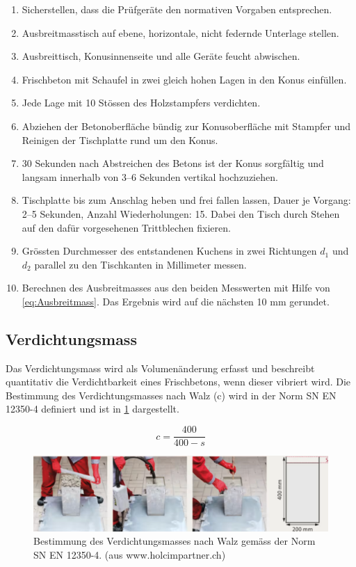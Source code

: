 \begin{enumerate}
    \item Sicherstellen, dass die Prüfgeräte den normativen Vorgaben entsprechen.
    \item Ausbreitmasstisch auf ebene, horizontale, nicht federnde Unterlage stellen.
    \item Ausbreittisch, Konusinnenseite und alle Geräte feucht abwischen.
    \item Frischbeton mit Schaufel in zwei gleich hohen Lagen in den Konus einfüllen.
    \item Jede Lage mit 10 Stössen des Holzstampfers verdichten.
    \item Abziehen der Betonoberfläche bündig zur Konusoberfläche mit Stampfer und Reinigen der Tischplatte rund um den Konus.
    \item 30 Sekunden nach Abstreichen des Betons ist der Konus sorgfältig und langsam innerhalb von 3–6 Sekunden vertikal hochzuziehen.
    \item Tischplatte bis zum Anschlag heben und frei fallen lassen, Dauer je Vorgang: 2–5 Sekunden, Anzahl Wiederholungen: 15. Dabei den Tisch durch Stehen auf den dafür vorgesehenen Trittblechen fixieren.
    \item Grössten Durchmesser des entstandenen Kuchens in zwei Richtungen $d_1$ und $d_2$ parallel zu den Tischkanten in Millimeter messen.
    \item Berechnen des Ausbreitmasses aus den beiden Messwerten mit Hilfe von  \cref{eq:Ausbreitmass}.  Das Ergebnis wird auf die nächsten 10 mm gerundet.
\end{enumerate}


\subsection*{Verdichtungsmass}
Das Verdichtungsmass wird als Volumenänderung erfasst und beschreibt quantitativ die Verdichtbarkeit eines Frischbetons, wenn dieser vibriert wird. Die Bestimmung des Verdichtungsmasses nach Walz (c) wird in der Norm SN EN 12350-4 definiert und ist in \cref{fig:BestimmungVerdichtungsmass} dargestellt.

\begin{equation}
	c = \dfrac{400}{400-s}
	\label{eq:Verdichtungsmass}
\end{equation}


\begin{figure}[h!bt]
	\centering
	\includegraphics[width=1.0\linewidth]{Bilder/Verdichtungsmass}
	\caption{Bestimmung des Verdichtungsmasses nach Walz gemäss der Norm SN EN 12350-4. (aus www.holcimpartner.ch)}
	\label{fig:BestimmungVerdichtungsmass}
\end{figure}



